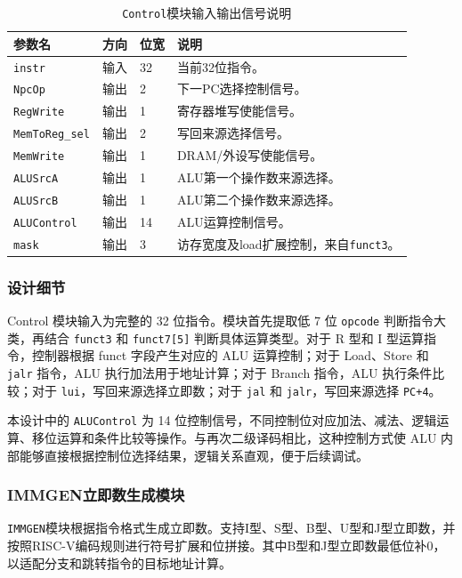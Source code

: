 \documentclass[12pt,a4paper]{ctexart}
\newcommand{\code}[1]{\texttt{#1}}
\begin{document}
\begin{table}[H]
\centering
\caption{\code{Control}模块输入输出信号说明}
\footnotesize
\renewcommand{\arraystretch}{1.15}
\begin{tabularx}{\textwidth}{p{3.2cm}p{1.5cm}p{2.1cm}X}
\toprule
参数名 & 方向 & 位宽 & 说明 \\
\midrule
\code{instr} & 输入 & 32 & 当前32位指令。 \\
\code{NpcOp} & 输出 & 2 & 下一PC选择控制信号。 \\
\code{RegWrite} & 输出 & 1 & 寄存器堆写使能信号。 \\
\code{MemToReg\_sel} & 输出 & 2 & 写回来源选择信号。 \\
\code{MemWrite} & 输出 & 1 & DRAM/外设写使能信号。 \\
\code{ALUSrcA} & 输出 & 1 & ALU第一个操作数来源选择。 \\
\code{ALUSrcB} & 输出 & 1 & ALU第二个操作数来源选择。 \\
\code{ALUControl} & 输出 & 14 & ALU运算控制信号。 \\
\code{mask} & 输出 & 3 & 访存宽度及load扩展控制，来自\code{funct3}。 \\
\bottomrule
\end{tabularx}
\end{table}

\subsubsection*{设计细节}

Control 模块输入为完整的 32 位指令。模块首先提取低 7 位 \code{opcode} 判断指令大类，再结合 \code{funct3} 和 \code{funct7[5]} 判断具体运算类型。对于 R 型和 I 型运算指令，控制器根据 funct 字段产生对应的 ALU 运算控制；对于 Load、Store 和 \code{jalr} 指令，ALU 执行加法用于地址计算；对于 Branch 指令，ALU 执行条件比较；对于 \code{lui}，写回来源选择立即数；对于 \code{jal} 和 \code{jalr}，写回来源选择 \code{PC+4}。

本设计中的 \code{ALUControl} 为 14 位控制信号，不同控制位对应加法、减法、逻辑运算、移位运算和条件比较等操作。与再次二级译码相比，这种控制方式使 ALU 内部能够直接根据控制位选择结果，逻辑关系直观，便于后续调试。

\subsubsection{IMMGEN立即数生成模块}

\code{IMMGEN}模块根据指令格式生成立即数。支持I型、S型、B型、U型和J型立即数，并按照RISC-V编码规则进行符号扩展和位拼接。其中B型和J型立即数最低位补0，以适配分支和跳转指令的目标地址计算。
\end{document}
